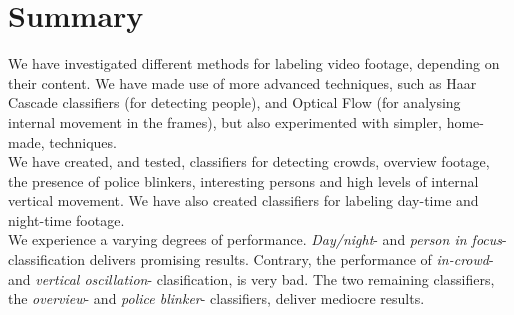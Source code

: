 \section{Summary}
%
We have investigated different methods for labeling video footage, depending on their content. We have made use of more advanced techniques, such as Haar Cascade classifiers\cite{viola01,lienhart01,schmidt01,schmidt02} (for detecting people), and Optical Flow\cite{Bouguet2000} (for analysing internal movement in the frames), but also experimented with simpler, home-made, techniques.\\
We have created, and tested, classifiers for detecting crowds, overview footage, the presence of police blinkers, interesting persons and high levels of internal vertical movement. We have also created classifiers for labeling day-time and night-time footage.\\
We experience a varying degrees of performance. \textit{Day/night}- and \textit{person in focus}- classification delivers promising results. Contrary, the performance of \textit{in-crowd}- and \textit{vertical oscillation}- clasification, is very bad. The two remaining classifiers, the \textit{overview}- and \textit{police blinker}- classifiers, deliver mediocre results.
